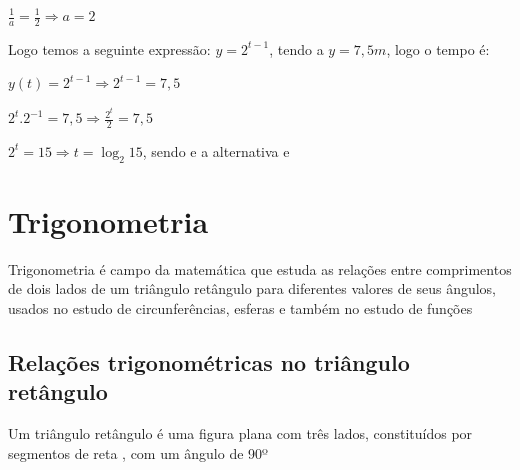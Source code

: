 \begin{multicols*}{2}
    $\frac{1}{a} = \frac{1}{2} \Rightarrow a = 2$

    Logo temos a seguinte expressão: $y = 2^{t-1}$, tendo a $y = 7,5m$, logo o tempo é:

    $y(t) = 2^{t-1} \Rightarrow 2^{t-1} = 7,5$

    $2^{t}.2^{-1} = 7,5 \Rightarrow \frac{2^{t}}{2} = 7,5$

    $2^{t} = 15 \Rightarrow t = \log_2 15$, sendo e a alternativa e

    \section*{Trigonometria}

    Trigonometria é campo da matemática que estuda as relações entre comprimentos de dois lados de 			um triângulo retângulo para diferentes valores de seus ângulos, usados no estudo de 					circunferências, esferas e também no estudo de funções
    \subsection*{Relações trigonométricas no triângulo retângulo}
    Um triângulo retângulo é uma figura plana com três lados, constituídos por segmentos de reta , 			com um ângulo de 90º






    \begin{figure}[H]
        \centering
\end{figure}
\end{multicols*}
